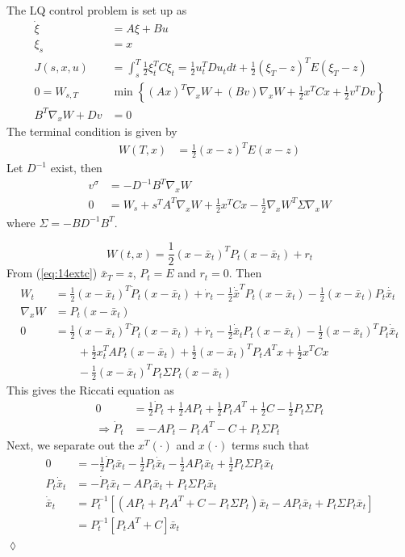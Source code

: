 \begin{example}
The LQ control problem is set up as
\begin{align*}
\dot{\xi} &= A\xi+Bu \\
\xi_s &= x \\
J(s,x,u) &= \int_s^T\frac{1}{2}\xi_t^TC\xi_t = \frac{1}{2}u_t^TDu_tdt + \frac{1}{2}(\xi_T-z)^TE(\xi_T-z) \\
0 = W_{s,T} &\min\left\lbrace (Ax)^T\nabla_xW + (Bv)\nabla_xW + \frac{1}{2}x^TCx + \frac{1}{2}v^TDv \right\rbrace \\
B^T\nabla_xW + Dv &= 0
\end{align*}
The terminal condition is given by
\begin{align}
\label{eq:14extc}
W(T,x) &= \frac{1}{2}(x-z)^TE(x-z)
\end{align}
Let $D^{-1}$ exist, then
\begin{align*}
v^\sigma &= -D^{-1}B^T\nabla_xW \\
0 &= W_s+s^TA^T\nabla_xW + \frac{1}{2}x^TCx - \frac{1}{2}\nabla_xW^T\Sigma\nabla_xW
\end{align*}
where $\Sigma = -BD^{-1}B^T$.

$$W(t,x) = \frac{1}{2}(x-\bar{x}_t)^TP_t(x-\bar{x}_t) + r_t$$
From (\ref{eq:14extc}) $\bar{x}_T = z$, $P_t=E$ and $r_t=0$. Then
\begin{align*}
W_t &= \frac{1}{2}(x-\bar{x}_t)^T\dot{P}_t(x-\bar{x}_t)+\dot{r}_t - \frac{1}{2}\dot{\bar{x}}^TP_t(x-\bar{x}_t) - \frac{1}{2}(x-\bar{x}_t)P_t\dot{\bar{x}_t} \\
\nabla_xW &= P_t(x-\bar{x}_t) \\
0 &= \frac{1}{2}(x-\bar{x}_t)^T\dot{P}_t(x-\bar{x}_t) + \dot{r}_t - \frac{1}{2}\dot{\bar{x}}_tP_t(x-\bar{x}_t) - \frac{1}{2}(x-\bar{x}_t)^TP_t\dot{\bar{x}}_t \\
&\qquad + \frac{1}{2}x_t^TAP_t(x-\bar{x}_t) + \frac{1}{2}(x-\bar{x}_t)^TP_tA^Tx + \frac{1}{2}x^TCx \\
&\qquad - \frac{1}{2}(x-\bar{x}_t)^TP_t\Sigma P_t(x-\bar{x}_t)
\end{align*}
This gives the Riccati equation as
\begin{align*}
0 &= \frac{1}{2}\dot{P}_t + \frac{1}{2}AP_t + \frac{1}{2}P_tA^T + \frac{1}{2}C - \frac{1}{2}P_t\Sigma P_t \\
\Rightarrow \dot{P}_t &= -AP_t - P_tA^T - C + P_t\Sigma P_t
\end{align*}
Next, we separate out the $x^T(\cdot)$ and $x(\cdot)$ terms such that
\begin{align*}
0 &= -\frac{1}{2}\dot{P}_t\bar{x}_t - \frac{1}{2}P_t\dot{\bar{x}}_t - \frac{1}{2}AP_t\bar{x}_t + \frac{1}{2}P_t\Sigma P_t\bar{x}_t \\
P_t\dot{\bar{x}}_t &= -\dot{P}_t\bar{x}_t - AP_t\bar{x}_t + P_t\Sigma P_t\bar{x}_t \\
\dot{\bar{x}}_t &= P_t^{-1}\left[ (AP_t+P_tA^T+C-P_t\Sigma P_t)\bar{x}_t - AP_t\bar{x}_t + P_t\Sigma P_t\bar{x}_t \right] \\
&= P_t^{-1}\left[P_tA^T + C\right] \bar{x}_t
\end{align*}
$\lozenge$
\end{example}

